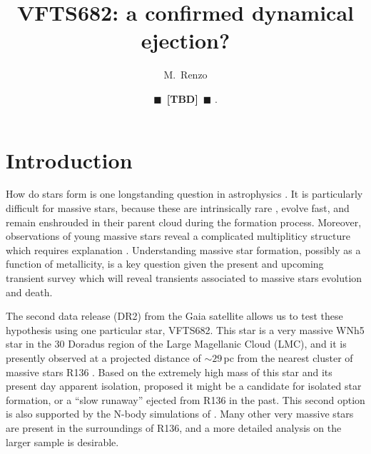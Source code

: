 \documentclass{aa}
\newcommand{\todo}[1]{{\large $\blacksquare$~\textbf{\color{red}[#1]}}~$\blacksquare$}
\begin{document}
\title{VFTS682: a confirmed dynamical ejection?}

\author{M.~Renzo \and \todo{TBD}%
  .} 

  
\date{}
\abstract{}

\maketitle{}

\section{Introduction}
\label{sec:intro}

How do stars form is one longstanding question in astrophysics
\cite{lada:03, zinnecker:07}. It is particularly difficult for massive stars, because these are intrinsically rare
\citep[e.g.,][]{salpeter:55,kroupa:01, schneider:18}, evolve fast, and
remain enshrouded in their parent cloud during the formation
process. Moreover, observations of young massive stars reveal a
complicated multipliticy structure which requires
explanation \citep[][]{kobulnicky:07,mason:09,sana:11,sana:12,kiminki:12,chini:12,kobulnicky:14,almeida:17,demarco:17}. Understanding massive star formation, possibly as a
function of metallicity, is a key question given the present and upcoming
transient survey \citep[e.g., LSST, BlackGem, LIGO/Virgo O3][]{} which
will reveal transients associated to massive stars
evolution and death.

The second data release (DR2) from the Gaia satellite
\cite[][]{gaia:16,brown:18} allows us to test
these hypothesis using one particular star, VFTS682. 
This star is a
very massive \citep[$M_\mathrm{ZAMS}\simeq150\,M_\odot$,][]{bestenlehner:11,schneider:18} WNh5 star in the 30 Doradus region
of the Large Magellanic Cloud (LMC), and it is presently observed at a
projected distance of $\sim$$29$\,pc from the nearest cluster of
massive stars R136 \citep[][]{bestenlehner:11}. Based on the extremely high mass of this star and
its present day apparent isolation, \cite{bestenlehner:11} proposed it
might be a candidate for isolated star formation, or a ``slow runaway'' ejected
from R136 in the past. This second option is also supported by the
N-body simulations of \cite{fujii:11, banerjee:12}.   Many other
very massive stars are present in the surroundings of R136, and a more
detailed analysis on the larger sample is desirable.
\end{document}

